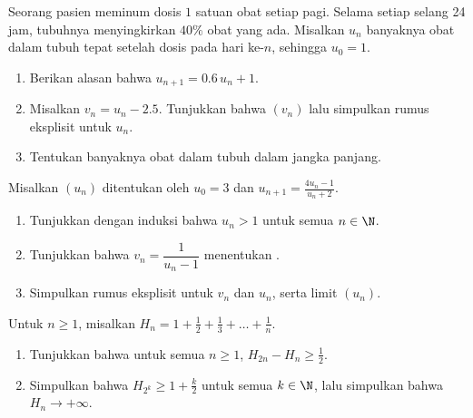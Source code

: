 \begin{exercise}[$\star\star$]\label{exo:g12:seq:7}
Seorang pasien meminum dosis $1$ satuan obat setiap pagi. Selama setiap
selang 24 jam, tubuhnya menyingkirkan $40\%$ obat yang ada. Misalkan $u_n$
banyaknya obat dalam tubuh tepat setelah dosis pada hari ke-$n$, sehingga
$u_0 = 1$.
\begin{enumerate}
  \item Berikan alasan bahwa $u_{n+1} = 0.6\,u_n + 1$.
  \item Misalkan $v_n = u_n - 2.5$. Tunjukkan bahwa $(v_n)$  lalu
        simpulkan rumus eksplisit untuk $u_n$.
  \item Tentukan banyaknya obat dalam tubuh dalam jangka panjang.
\end{enumerate}
\end{exercise}

\begin{exercise}[$\star\star$]\label{exo:g12:seq:8}
Misalkan $(u_n)$ ditentukan oleh $u_0 = 3$ dan $u_{n+1} = \frac{4u_n - 1}{u_n + 2}$.
\begin{enumerate}
  \item Tunjukkan dengan induksi bahwa $u_n > 1$ untuk semua $n \in \N$.
  \item Tunjukkan bahwa $v_n = \dfrac{1}{u_n - 1}$ menentukan .
  \item Simpulkan rumus eksplisit untuk $v_n$ dan $u_n$, serta limit
        $(u_n)$.
\end{enumerate}
\end{exercise}

\begin{exercise}[$\star\star\star$]\label{exo:g12:seq:9}
Untuk $n \geq 1$, misalkan
$H_n = 1 + \frac{1}{2} + \frac{1}{3} + \dots + \frac{1}{n}$.
\begin{enumerate}
  \item Tunjukkan bahwa untuk semua $n \geq 1$, $H_{2n} - H_n \geq \frac{1}{2}$.
  \item Simpulkan bahwa $H_{2^k} \geq 1 + \frac{k}{2}$ untuk semua $k \in \N$,
        lalu simpulkan bahwa $H_n \to +\infty$.
\end{enumerate}
\end{exercise}

